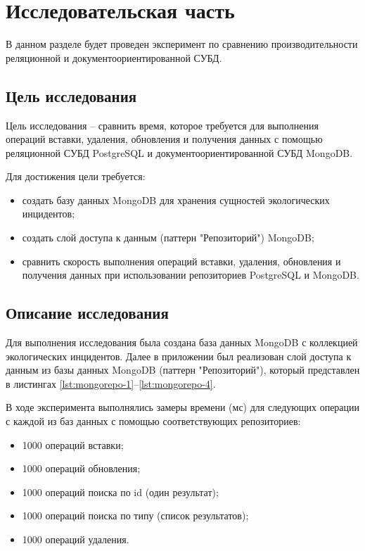 \chapter{Исследовательская часть}
В данном разделе будет проведен эксперимент по сравнению производительности реляционной и документоориентированной СУБД.

\section{Цель исследования}

Цель исследования -- сравнить время, которое требуется для выполнения операций вставки, удаления, обновления и получения данных с помощью реляционной СУБД PostgreSQL и документоориентированной СУБД MongoDB.  

Для достижения цели требуется:
\begin{itemize}
\item создать базу данных MongoDB для хранения сущностей экологических инцидентов;
\item создать слой доступа к данным (паттерн "Репозиторий") MongoDB;
\item сравнить скорость выполнения операций вставки, удаления, обновления и получения данных при использовании репозиториев PostgreSQL и MongoDB.
\end{itemize}

\section{Описание исследования}
Для выполнения исследования была создана база данных MongoDB с коллекцией экологических инцидентов. Далее в приложении был реализован слой доступа к данным из базы данных MongoDB (паттерн "Репозиторий"), который представлен в листингах \ref{lst:mongorepo-1}--\ref{lst:mongorepo-4}.

В ходе эксперимента выполнялись замеры времени (мс) для следующих операции с каждой из баз данных с помощью соответствующих репозиториев: 
\begin{itemize}
	\item 1000 операций вставки;
	\item 1000 операций обновления;
	\item 1000 операций поиска по id (один результат);
	\item 1000 операций поиска по типу (список результатов);
	\item 1000 операций удаления.
\end{itemize}

